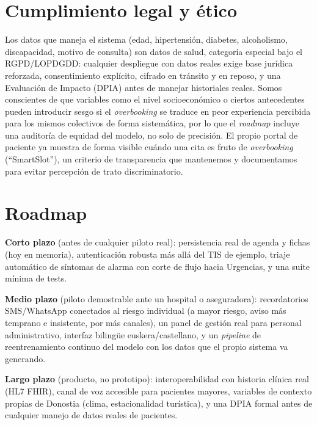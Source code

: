 \documentclass[11pt,a4paper]{article}
\begin{document}
\section{Cumplimiento legal y ético}

Los datos que maneja el sistema (edad, hipertensión, diabetes, alcoholismo, discapacidad, motivo de consulta) son datos de salud, categoría especial bajo el RGPD/LOPDGDD: cualquier despliegue con datos reales exige base jurídica reforzada, consentimiento explícito, cifrado en tránsito y en reposo, y una Evaluación de Impacto (DPIA) antes de manejar historiales reales. Somos conscientes de que variables como el nivel socioeconómico o ciertos antecedentes pueden introducir sesgo si el \textit{overbooking} se traduce en peor experiencia percibida para los mismos colectivos de forma sistemática, por lo que el \textit{roadmap} incluye una auditoría de equidad del modelo, no solo de precisión. El propio portal de paciente ya muestra de forma visible cuándo una cita es fruto de \textit{overbooking} (``SmartSlot''), un criterio de transparencia que mantenemos y documentamos para evitar percepción de trato discriminatorio.

\section{Roadmap}

\textbf{Corto plazo} (antes de cualquier piloto real): persistencia real de agenda y fichas (hoy en memoria), autenticación robusta más allá del TIS de ejemplo, triaje automático de síntomas de alarma con corte de flujo hacia Urgencias, y una suite mínima de tests.

\textbf{Medio plazo} (piloto demostrable ante un hospital o aseguradora): recordatorios SMS/WhatsApp conectados al riesgo individual (a mayor riesgo, aviso más temprano e insistente, por más canales), un panel de gestión real para personal administrativo, interfaz bilingüe euskera/castellano, y un \textit{pipeline} de reentrenamiento continuo del modelo con los datos que el propio sistema va generando.

\textbf{Largo plazo} (producto, no prototipo): interoperabilidad con historia clínica real (HL7 FHIR), canal de voz accesible para pacientes mayores, variables de contexto propias de Donostia (clima, estacionalidad turística), y una DPIA formal antes de cualquier manejo de datos reales de pacientes.
\end{document}
